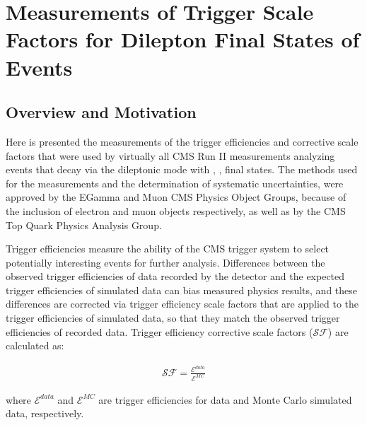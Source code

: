
\chapter{Measurements of Trigger Scale Factors for Dilepton Final States of \ttbar Events}

\section{Overview and Motivation}
Here is presented the measurements of the trigger efficiencies and corrective scale factors that were used by virtually all CMS Run II measurements analyzing \ttbar events that decay via the dileptonic mode with \ee, \emu, \mumu final states.  
The methods used for the measurements and the determination of systematic uncertainties, were approved by the EGamma and Muon CMS Physics Object Groups, because of the inclusion of electron and muon objects respectively, as well as by the CMS Top Quark Physics Analysis Group.

Trigger efficiencies measure the ability of the CMS trigger system to select potentially interesting events for further analysis.
Differences between the observed trigger efficiencies of data recorded by the detector and the expected trigger efficiencies of simulated data can bias measured physics results, and these differences are corrected via trigger efficiency scale factors that are applied to the trigger efficiencies of simulated data, so that they match the observed trigger efficiencies of recorded data.
Trigger efficiency corrective scale factors ($\mathcal{SF}$) are calculated as:
\begin{linenomath*}
\begin{align}
\mathcal{SF} = \frac{\mathcal{E}^{data}}{\mathcal{E}^{MC}}
\label{SF}
\end{align}
\end{linenomath*}
where $\mathcal{E}^{data}$ and $\mathcal{E}^{MC}$ are trigger efficiencies for data and Monte Carlo simulated data, respectively.

